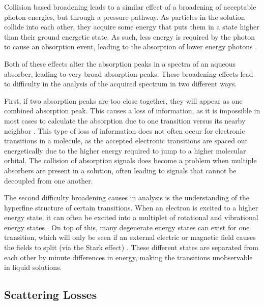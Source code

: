 Collision based broadening leads to a similar effect of a broadening of
acceptable photon energies, but through a pressure pathway. As particles in
the solution collide into each other, they acquire some energy that puts them
in a state higher than their ground energetic state. As such, less energy is
required by the photon to cause an absorption event, leading to the absorption
of lower energy photons \cite{Ngo:2012jk}.

Both of these effects alter the absorption peaks in a spectra of an
aqueous absorber, leading to very broad absorption peaks. These broadening
effects lead to difficulty in the analysis of the acquired spectrum in two
different ways.

First, if two absorption peaks are too close together, they will appear as
one combined absorption peak. This causes a loss of information, as it is
impossible in most cases to calculate the absorption due to one transition
versus its nearby neighbor \cite{Fowles:1975wg}. This type of loss of
information does not often occur for electronic transitions in a molecule, as
the accepted electronic transitions are spaced out energetically due to the
higher energy required to jump to a higher molecular orbital. The collision of
absorption signals does become a problem when multiple absorbers are present
in a solution, often leading to signals that cannot be decoupled from one
another.

The second difficulty broadening causes in analysis is the understanding of
the hyperfine structure of certain transitions. When an electron is excited to
a higher energy state, it can often be excited into a multiplet of rotational
and vibrational energy states \cite{Levine:2008uh}. On top of this, many
degenerate energy states can exist for one transition, which will only be seen
if an external electric or magnetic field causes the fields to split (via
the Stark effect) \cite{Condon:1951wd}. These different states are separated
from each other by minute differences in energy, making the transitions
unobservable in liquid solutions.



\subsection{Scattering Losses}\label{subsec:scattering}

